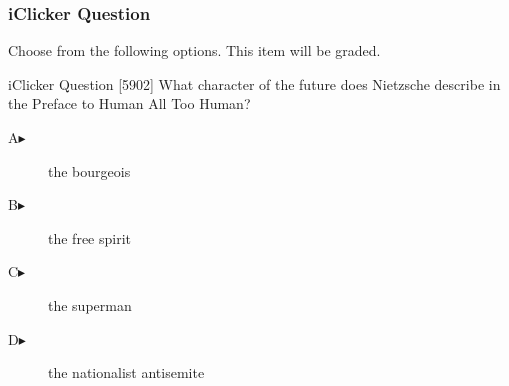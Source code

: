 \begin{frame}
  \frametitle{iClicker Question}
Choose from the following options. This item will be graded.
\begin{block}{iClicker Question}
[5902] What character of the future does Nietzsche describe in the
Preface to Human All Too Human?
\end{block}
\begin{description}
\item[A\hspace{.2in}$\blacktriangleright$] the bourgeois
\item[B\hspace{.2in}$\blacktriangleright$] the free spirit
\item[C\hspace{.2in}$\blacktriangleright$] the superman
\item[D\hspace{.2in}$\blacktriangleright$] the nationalist antisemite
\end{description}
\end{frame}